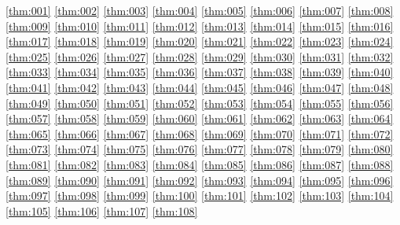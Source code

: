 \ref{thm:001}  \ref{thm:002}  \ref{thm:003}  \ref{thm:004}  \ref{thm:005}  \ref{thm:006}  \ref{thm:007}  \ref{thm:008}  \ref{thm:009}  \ref{thm:010}  \ref{thm:011}  \ref{thm:012}  \ref{thm:013}  \ref{thm:014}  \ref{thm:015}  \ref{thm:016}  \ref{thm:017}  \ref{thm:018}  \ref{thm:019}  \ref{thm:020}  \ref{thm:021}  \ref{thm:022}  \ref{thm:023}  \ref{thm:024}  \ref{thm:025}  \ref{thm:026}  \ref{thm:027}  \ref{thm:028}  \ref{thm:029}  \ref{thm:030}  \ref{thm:031}  \ref{thm:032}  \ref{thm:033}  \ref{thm:034}  \ref{thm:035}  \ref{thm:036}  \ref{thm:037}  \ref{thm:038}  \ref{thm:039}  \ref{thm:040}  \ref{thm:041}  \ref{thm:042}  \ref{thm:043}  \ref{thm:044}  \ref{thm:045}  \ref{thm:046}  \ref{thm:047}  \ref{thm:048}  \ref{thm:049}  \ref{thm:050}  \ref{thm:051}  \ref{thm:052}  \ref{thm:053}  \ref{thm:054}  \ref{thm:055}  \ref{thm:056}  \ref{thm:057}  \ref{thm:058}  \ref{thm:059}  \ref{thm:060}  \ref{thm:061}  \ref{thm:062}  \ref{thm:063}  \ref{thm:064}  \ref{thm:065}  \ref{thm:066}  \ref{thm:067}  \ref{thm:068}  \ref{thm:069}  \ref{thm:070}  \ref{thm:071}  \ref{thm:072}  \ref{thm:073}  \ref{thm:074}  \ref{thm:075}  \ref{thm:076}  \ref{thm:077}  \ref{thm:078}  \ref{thm:079}  \ref{thm:080}  \ref{thm:081}  \ref{thm:082}  \ref{thm:083}  \ref{thm:084}  \ref{thm:085}  \ref{thm:086}  \ref{thm:087}  \ref{thm:088}  \ref{thm:089}  \ref{thm:090}  \ref{thm:091}  \ref{thm:092}  \ref{thm:093}  \ref{thm:094}  \ref{thm:095}  \ref{thm:096}  \ref{thm:097}  \ref{thm:098}  \ref{thm:099}  \ref{thm:100}  \ref{thm:101}  \ref{thm:102}  \ref{thm:103}  \ref{thm:104}  \ref{thm:105}  \ref{thm:106}  \ref{thm:107}  \ref{thm:108}